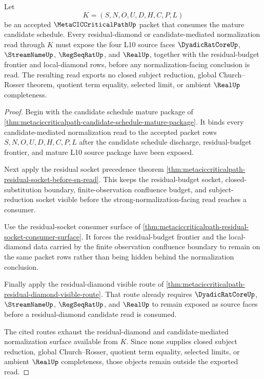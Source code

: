 \begin{theorem}
\label{thm:metaciccriticalpath-l10-residual-diamond-source-exhaustion}
Let
$$
K=(S,N,O,U,D,H,C,P,L)
$$
be an accepted $\MetaCICCriticalPathUp$ packet that consumes the mature candidate schedule. Every residual-diamond or candidate-mediated normalization read through $K$ must expose the four L10 source faces $\DyadicRatCoreUp$, $\StreamNameUp$, $\RegSeqRatUp$, and $\RealUp$, together with the residual-budget frontier and local-diamond rows, before any normalization-facing conclusion is read. The resulting read exports no closed subject reduction, global Church--Rosser theorem, quotient term equality, selected limit, or ambient $\RealUp$ completeness.
\end{theorem}
\begin{proof}
Begin with the candidate schedule mature package of \autoref{thm:metaciccriticalpath-candidate-schedule-mature-package}. It binds every candidate-mediated normalization read to the accepted packet rows $S,N,O,U,D,H,C,P,L$ after the candidate schedule discharge, residual-budget frontier, and mature L10 source package have been exposed.

Next apply the residual socket precedence theorem \autoref{thm:metaciccriticalpath-residual-socket-before-sn-read}. This keeps the residual-budget socket, closed-substitution boundary, finite-observation confluence budget, and subject-reduction socket visible before the strong-normalization-facing read reaches a consumer.

Use the residual-socket consumer surface of \autoref{thm:metaciccriticalpath-residual-socket-consumer-surface}. It forces the residual-budget frontier and the local-diamond data carried by the finite observation confluence boundary to remain on the same packet rows rather than being hidden behind the normalization conclusion.

Finally apply the residual-diamond visible route of \autoref{thm:metaciccriticalpath-residual-diamond-visible-route}. That route already requires $\DyadicRatCoreUp$, $\StreamNameUp$, $\RegSeqRatUp$, and $\RealUp$ to remain exposed as source faces before a residual-diamond candidate read is consumed.

The cited routes exhaust the residual-diamond and candidate-mediated normalization surface available from $K$. Since none supplies closed subject reduction, global Church--Rosser, quotient term equality, selected limits, or ambient $\RealUp$ completeness, those objects remain outside the exported read.
\end{proof}
